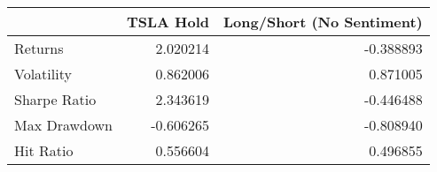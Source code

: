 \begin{tabular}{lrr}
\toprule
{} &  TSLA Hold &  Long/Short (No Sentiment) \\
\midrule
Returns      &   2.020214 &                  -0.388893 \\
Volatility   &   0.862006 &                   0.871005 \\
Sharpe Ratio &   2.343619 &                  -0.446488 \\
Max Drawdown &  -0.606265 &                  -0.808940 \\
Hit Ratio    &   0.556604 &                   0.496855 \\
\bottomrule
\end{tabular}
